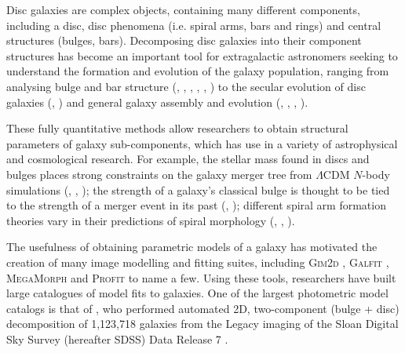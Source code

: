 \documentclass[../main.tex]{subfiles}
\begin{document}
\label{sec:introduction}

Disc galaxies are complex objects, containing many different components, including a disc, disc phenomena (i.e. spiral arms, bars and rings) and central structures (bulges, bars). Decomposing disc galaxies into their component structures has become an important tool for extragalactic astronomers seeking to understand the formation and evolution of the galaxy population, ranging from analysing bulge and bar structure (\citealt{1985ApJ...288..438E}, \citealt{1996A&AS..118..557D}, \citealt{2011MNRAS.415.3308G}, \citealt{Mendez-Abreu2016:1610.05324v1}, \citealt{Gao2017:1709.00746v1}, \citealt{2018MNRAS.473.4731K}) to the secular evolution of disc galaxies (\citealt{1998ApJ...500...75L}, \citealt{2005ApJ...635..959B}) and general galaxy assembly and evolution (\citealt{Simard2002:astro-ph/0205025v2}, \citealt{megamorph-paper}, \citealt{2012MNRAS.421.2277L}, \citealt{2019arXiv191002664R}).

These fully quantitative methods allow researchers to obtain structural parameters of galaxy sub-components, which has use in a variety of astrophysical and cosmological research. For example, the stellar mass found in discs and bulges places strong constraints on the galaxy merger tree from $\Lambda$CDM $N$-body simulations (\citealt{2009MNRAS.396.1972P}, \citealt{Hopkins2010:1004.2708v3}, \citealt{2018MNRAS.475.5133R}); the strength of a galaxy's classical bulge is thought to be tied to the strength of a merger event in its past (\citealt{2005ApJ...622L...9S}, \citealt{Kormendy2010:1009.3015v1}); different spiral arm formation theories vary in their predictions of spiral morphology (\citealt{Dobbs2014:1407.5062v1}, \citealt{Pour-Imani2016:1608.00969v1}, \citealt{2017MNRAS.472.2263H}).

The usefulness of obtaining parametric models of a galaxy has motivated the creation of many image modelling and fitting suites, including \textsc{Gim2d} \citep{gim2d-paper}, \textsc{Galfit} \citep{galfit-paper}, \textsc{MegaMorph} \citep{megamorph-paper} and \textsc{Profit} \citep{profit-paper} to name a few. Using these tools, researchers have built large catalogues of model fits to galaxies. One of the largest photometric model catalogs is that of \citet{2011ApJS..196...11S}, who performed automated 2D, two-component (bulge + disc) decomposition of 1,123,718 galaxies from the Legacy imaging of the Sloan Digital Sky Survey (hereafter SDSS) Data Release 7 \citep{SDSSDR7}.
\end{document}
